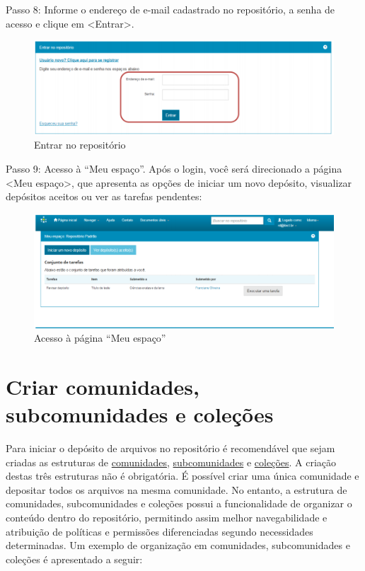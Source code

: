 \documentclass[12pt,hidelinks]{article}
\begin{document}
        Passo 8: Informe o endereço de e-mail cadastrado no repositório, a senha de acesso e clique em <Entrar>.
        
        \begin{figure}[!htp]
                \centering
                \includegraphics[scale=0.6]{figura/Figura8.png}
                \caption{Entrar no repositório}
            \label{Rotulo}
        \end{figure}
        
\newpage
        Passo 9: Acesso à “Meu espaço”. Após o login, você será direcionado a página <Meu espaço>, que apresenta as opções de iniciar um novo depósito, visualizar depósitos aceitos ou ver as tarefas pendentes:
        
        \begin{figure}[!htp]
                \centering
                \includegraphics[scale=0.6]{figura/Figura9.png}
                \caption{Acesso à página “Meu espaço”}
            \label{Rotulo}
        \end{figure}
        
        
\newpage        
\section{Criar comunidades, subcomunidades e coleções}
\newpage

    Para iniciar o depósito de arquivos no repositório é recomendável que sejam criadas as
    estruturas de \underline{comunidades}, \underline{subcomunidades} e \underline{coleções}. 
    \singlespacing
    A criação destas três estruturas não é obrigatória. É possível criar uma única comunidade e depositar todos os arquivos na mesma comunidade. No entanto, a estrutura de comunidades, subcomunidades e coleções possui a funcionalidade de organizar o conteúdo dentro do repositório, permitindo assim melhor navegabilidade e atribuição de políticas e permissões diferenciadas segundo necessidades determinadas. Um exemplo de organização em comunidades, subcomunidades e coleções é apresentado a seguir:
    
\end{document}
